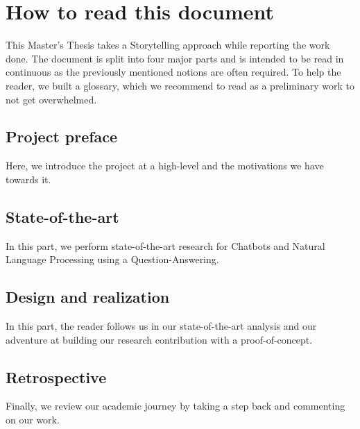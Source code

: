 \chapter{How to read this document}
\label{chap:how-to-read}
This Master's Thesis takes a Storytelling approach while reporting the work done. The document is split into four major parts and is intended to be read in continuous as the previously mentioned notions are often required. To help the reader, we built a glossary, which we recommend to read as a preliminary work to not get overwhelmed. 

\section*{Project preface}
Here, we introduce the project at a high-level and the motivations we have towards it.

\section*{State-of-the-art}
In this part, we perform state-of-the-art research for Chatbots and Natural Language Processing using a Question-Answering.

\section*{Design and realization}
In this part, the reader follows us in our state-of-the-art analysis and our adventure at building our research contribution with a proof-of-concept.

\section*{Retrospective}
Finally, we review our academic journey by taking a step back and commenting on our work.